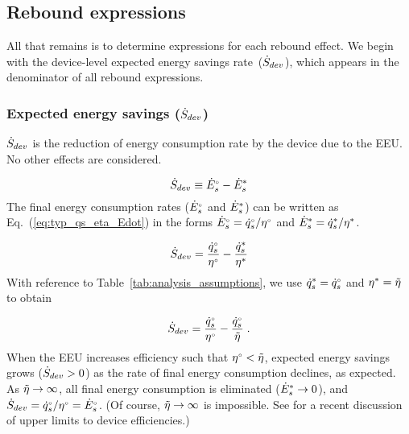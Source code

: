 












\subsection{Rebound expressions}
\label{sec:rebound_expressions}

All that remains is to determine expressions for each rebound effect.
We begin with the device-level expected energy savings rate~($\dot{S}_{dev}$), which
appears in the denominator of all rebound expressions.


\subsubsection{Expected energy savings ($\dot{S}_{dev}$)} 
\label{sec:Sdot}

$\dot{S}_{dev}$ is the reduction of energy consumption rate
by the device due to the EEU.
No other effects are considered.

\begin{equation} \label{eq:S_dot_def}
  \dot{S}_{dev} \equiv {}{\dot{E}}^{\scriptscriptstyle \circ}_s - {\dot{E}}^*_s
\end{equation}
%
The final energy consumption rates (${}{\dot{E}}^{\scriptscriptstyle \circ}_s$ and ${\dot{E}}^*_s$) 
can be written as Eq.~(\ref{eq:typ_qs_eta_Edot}) in the forms
${}{\dot{E}}^{\scriptscriptstyle \circ}_s = {}{\dot{q}}^{\scriptscriptstyle \circ}_s/{}{\eta}^{\scriptscriptstyle \circ}$ and 
${\dot{E}}^*_s = {\dot{q}}^*_s/{\eta}^*$. 

\begin{equation}
  \dot{S}_{dev} = \frac{{}{\dot{q}}^{\scriptscriptstyle \circ}_s}{{}{\eta}^{\scriptscriptstyle \circ}} - \frac{{\dot{q}}^*_s}{{\eta}^*}
\end{equation}
%
With reference to Table~\ref{tab:analysis_assumptions}, 
we use ${\dot{q}}^*_s = {}{\dot{q}}^{\scriptscriptstyle \circ}_s$ and ${\eta}^* = \tilde{\eta}$ to obtain

\begin{equation}
  \dot{S}_{dev} = \frac{{}{\dot{q}}^{\scriptscriptstyle \circ}_s}{{}{\eta}^{\scriptscriptstyle \circ}} - \frac{{}{\dot{q}}^{\scriptscriptstyle \circ}_s}{\tilde{\eta}} \; .
\end{equation}
%
When the EEU increases efficiency such that 
${}{\eta}^{\scriptscriptstyle \circ} < \tilde{\eta}$,
expected energy savings grows ($\dot{S}_{dev} > 0$)
as the rate of final energy consumption declines,
as expected.
As $\tilde{\eta} \rightarrow \infty$,
all final energy consumption is eliminated (${\dot{E}}^*_s \rightarrow 0$), and
$\dot{S}_{dev} = {}{\dot{q}}^{\scriptscriptstyle \circ}_s/{}{\eta}^{\scriptscriptstyle \circ} = {}{\dot{E}}^{\scriptscriptstyle \circ}_s$.
(Of course, $\tilde{\eta} \rightarrow \infty$ is impossible. 
See \citet{Paoli:2020aa} for a recent discussion of upper limits to device efficiencies.)

